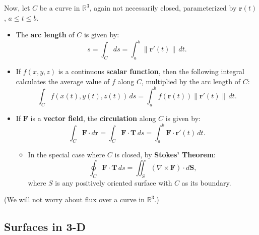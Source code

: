 \documentclass[10pt]{article}
\newcommand{\mb}[1]{\mathbf{#1}}
\newcommand{\vecfuc}[2]{\mb{#1}(#2)}
\newcommand{\dvecfuc}[2]{\mb{#1}'(#2)}
\newcommand{\normdvecfuc}[2]{\| \mb{#1}'(#2) \|}
\newcommand{\R}{\mathbb{R}}
\begin{document}
Now, let \(C\) be a curve in \(\R^{3}\), again not necessarily closed, parameterized by \(\vecfuc{r}{t}\), \(a \leq t \leq b\).
\begin{itemize}
    \item The \textcolor{horange!80}{\textbf{arc length}} of \(C\) is given by:
    \[
        s = \displaystyle\int_{C} ds = \int_{a}^{b} \normdvecfuc{r}{t} \, dt.
    \]
    \item If \(f(x,y,z)\) is a continuous \textcolor{horange!80}{\textbf{scalar function}}, then the following integral calculates the average value of \(f\) along \(C\), multiplied by the arc length of \(C\):
    \[
        \int_{C} f(x(t), y(t), z(t)) \, ds = \int_{a}^{b} f(\vecfuc{r}{t}) \normdvecfuc{r}{t} \, dt.
    \]
    \item If \(\mb{F}\) is a \textcolor{horange!80}{\textbf{vector field}}, the \textcolor{horange!80}{\textbf{circulation}} along \(C\) is given by:
    \[
        \int_{C} \mb{F} \cdot d\mb{r} = \int_{C} \mb{F} \cdot \mb{T} \, ds = \int_{a}^{b} \mb{F} \cdot \dvecfuc{r}{t} \, dt.
    \]
    \begin{itemize}
        \item In the special case where \(C\) is closed, by \textcolor{horange!80}{\textbf{Stokes’ Theorem}}:
        \[
            \oint_{C} \mb{F} \cdot \mb{T} \, ds = \iint_{S} (\nabla \times \mb{F}) \cdot d\mb{S},
        \]
        where \(S\) is any positively oriented surface with \(C\) as its boundary.
    \end{itemize}
\end{itemize}
(We will not worry about flux over a curve in \(\R^{3}\).)

\subsection*{Surfaces in 3-D}
\end{document}
